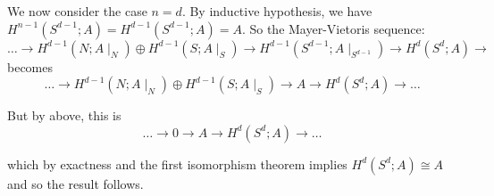 We now consider the case $n =d$. By inductive hypothesis, we have $H^{n-1}(S^{d-1};A)=H^{d-1}(S^{d-1};A) =A.$ So the Mayer-Vietoris sequence:
\[\ldots \rightarrow H^{d-1}(N;A\mid_N) \oplus H^{d-1}(S;A\mid_S) \rightarrow H^{d-1}(S^{d-1}; A\mid_{S^{d-1}}) \rightarrow H^d(S^d;A) \rightarrow\]
becomes
\[\ldots  \rightarrow H^{d-1}(N;A\mid_N) \oplus H^{d-1}(S;A\mid_S) \rightarrow A \rightarrow H^d(S^d;A) \rightarrow \ldots\]

But by above, this is 
\[\ldots  \rightarrow 0\rightarrow A \rightarrow H^d(S^d;A) \rightarrow \ldots\]

which by exactness and the first isomorphism theorem implies $H^d(S^d;A) \cong A$ and so the result follows.

 
